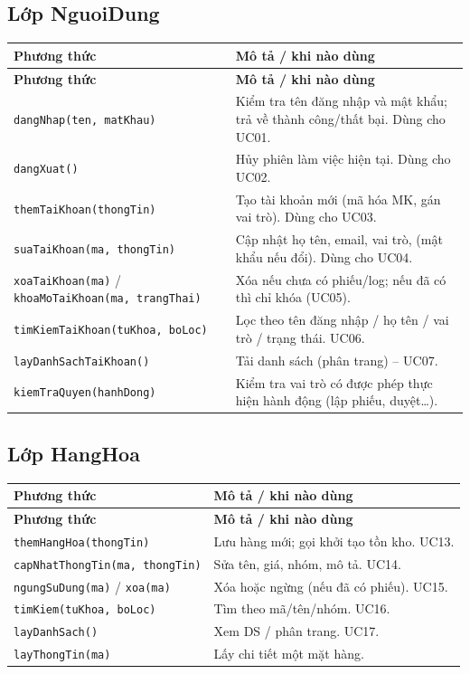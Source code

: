 \subsection{Lớp NguoiDung}

\begin{longtable}{|p{4.2cm}|p{8.5cm}|}
\hline
\textbf{Phương thức} & \textbf{Mô tả / khi nào dùng} \\
\hline
\endfirsthead
\hline
\textbf{Phương thức} & \textbf{Mô tả / khi nào dùng} \\
\hline
\endhead
\texttt{dangNhap(ten, matKhau)} & Kiểm tra tên đăng nhập và mật khẩu; trả về thành công/thất bại. Dùng cho UC01. \\
\hline
\texttt{dangXuat()} & Hủy phiên làm việc hiện tại. Dùng cho UC02. \\
\hline
\texttt{themTaiKhoan(thongTin)} & Tạo tài khoản mới (mã hóa MK, gán vai trò). Dùng cho UC03. \\
\hline
\texttt{suaTaiKhoan(ma, thongTin)} & Cập nhật họ tên, email, vai trò, (mật khẩu nếu đổi). Dùng cho UC04. \\
\hline
\texttt{xoaTaiKhoan(ma)} / \texttt{khoaMoTaiKhoan(ma, trangThai)} & Xóa nếu chưa có phiếu/log; nếu đã có thì chỉ khóa (UC05). \\
\hline
\texttt{timKiemTaiKhoan(tuKhoa, boLoc)} & Lọc theo tên đăng nhập / họ tên / vai trò / trạng thái. UC06. \\
\hline
\texttt{layDanhSachTaiKhoan()} & Tải danh sách (phân trang) -- UC07. \\
\hline
\texttt{kiemTraQuyen(hanhDong)} & Kiểm tra vai trò có được phép thực hiện hành động (lập phiếu, duyệt\ldots). \\
\hline
\end{longtable}

\subsection{Lớp HangHoa}

\begin{longtable}{|p{4.2cm}|p{8.5cm}|}
\hline
\textbf{Phương thức} & \textbf{Mô tả / khi nào dùng} \\
\hline
\endfirsthead
\hline
\textbf{Phương thức} & \textbf{Mô tả / khi nào dùng} \\
\hline
\endhead
\texttt{themHangHoa(thongTin)} & Lưu hàng mới; gọi khởi tạo tồn kho. UC13. \\
\hline
\texttt{capNhatThongTin(ma, thongTin)} & Sửa tên, giá, nhóm, mô tả. UC14. \\
\hline
\texttt{ngungSuDung(ma)} / \texttt{xoa(ma)} & Xóa hoặc ngừng (nếu đã có phiếu). UC15. \\
\hline
\texttt{timKiem(tuKhoa, boLoc)} & Tìm theo mã/tên/nhóm. UC16. \\
\hline
\texttt{layDanhSach()} & Xem DS / phân trang. UC17. \\
\hline
\texttt{layThongTin(ma)} & Lấy chi tiết một mặt hàng. \\
\hline
\end{longtable}

